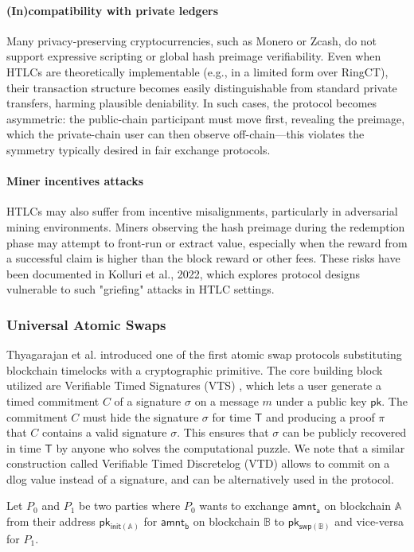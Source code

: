 \paragraph*{(In)compatibility with private ledgers}
Many privacy-preserving cryptocurrencies, such as Monero or Zcash, do not support expressive scripting or global hash preimage verifiability. Even when HTLCs are theoretically implementable (e.g., in a limited form over RingCT), their transaction structure becomes easily distinguishable from standard private transfers, harming plausible deniability. In such cases, the protocol becomes asymmetric: the public-chain participant must move first, revealing the preimage, which the private-chain user can then observe off-chain—this violates the symmetry typically desired in fair exchange protocols.
\paragraph*{Miner incentives attacks} HTLCs may also suffer from incentive misalignments, particularly in adversarial mining environments. Miners observing the hash preimage during the redemption phase may attempt to front-run or extract value, especially when the reward from a successful claim is higher than the block reward or other fees. These risks have been documented in Kolluri et al., 2022, which explores protocol designs vulnerable to such "griefing" attacks in HTLC settings.

\subsubsection{Universal Atomic Swaps}
Thyagarajan et al. \cite{uas} introduced one of the first atomic swap protocols substituting blockchain timelocks with a cryptographic primitive. 
The core building block utilized are Verifiable Timed Signatures (VTS) \cite{vts}, which lets a user generate a timed commitment $C$ of a signature $\sigma$ on a message $m$ under a public key $\mathsf{pk}$. The commitment $C $ must hide the signature $\sigma$ for time $\mathsf{T}$ and producing a proof $\pi$ that $C$ contains a valid signature $\sigma$. This ensures that $\sigma$ can be publicly recovered in time $\mathsf{T}$ by anyone who solves the computational puzzle. We note that a similar construction called Verifiable Timed Discretelog (VTD) allows to commit on a dlog value instead of a signature, and can be alternatively used in the protocol.

Let $P_0$ and $P_1$ be two parties where $P_0$ wants to exchange $\mathsf{amnt_a}$ on blockchain $\mathbb{A}$ from their address $\mathsf{pk_{init(\mathbb{A})}}$ for $\mathsf{amnt_b}$ on blockchain $\mathbb{B}$ to $\mathsf{pk_{swp(\mathbb{B})}}$ and vice-versa for $P_1$.

